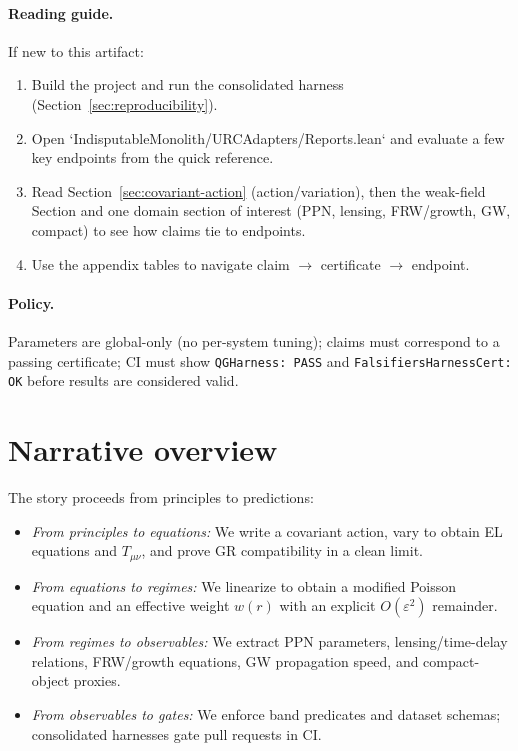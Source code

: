 \documentclass[11pt]{article}
\newcommand{\Tmunu}{T_{\mu\nu}}
\begin{document}
\paragraph{Reading guide.} If new to this artifact:
\begin{enumerate}
  \item Build the project and run the consolidated harness (Section~\ref{sec:reproducibility}).
  \item Open `IndisputableMonolith/URCAdapters/Reports.lean` and evaluate a few key endpoints from the quick reference.
  \item Read Section~\ref{sec:covariant-action} (action/variation), then the weak-field Section and one domain section of interest (PPN, lensing, FRW/growth, GW, compact) to see how claims tie to endpoints.
  \item Use the appendix tables to navigate claim \(\to\) certificate \(\to\) endpoint.
\end{enumerate}

\paragraph{Policy.} Parameters are global-only (no per-system tuning); claims must correspond to a passing certificate; CI must show \texttt{QGHarness: PASS} and \texttt{FalsifiersHarnessCert: OK} before results are considered valid.

\section*{Narrative overview}
The story proceeds from principles to predictions:
\begin{itemize}
  \item \emph{From principles to equations:} We write a covariant action, vary to obtain EL equations and \(\Tmunu\), and prove GR compatibility in a clean limit.
  \item \emph{From equations to regimes:} We linearize to obtain a modified Poisson equation and an effective weight \(w(r)\) with an explicit \(O(\varepsilon^2)\) remainder.
  \item \emph{From regimes to observables:} We extract PPN parameters, lensing/time-delay relations, FRW/growth equations, GW propagation speed, and compact-object proxies.
  \item \emph{From observables to gates:} We enforce band predicates and dataset schemas; consolidated harnesses gate pull requests in CI.
\end{itemize}
\end{document}
